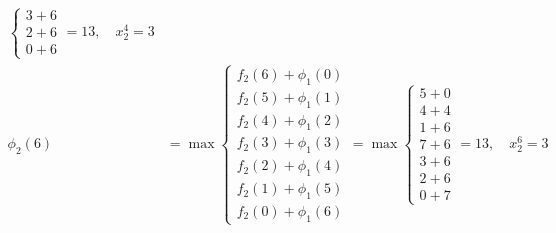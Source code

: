\documentclass{article}
\begin{document}
\[\begin{aligned}
\begin{cases}
                                                  3 + 6 \\
                                                  2 + 6 \\
                                                  0 + 6
                                              \end{cases} = 13, \quad x_2^4 = 3               \\
        \phi_2(6) & = \max \begin{cases}
                               f_2(6) + \phi_1(0) \\
                               f_2(5) + \phi_1(1) \\
                               f_2(4) + \phi_1(2) \\
                               f_2(3) + \phi_1(3) \\
                               f_2(2) + \phi_1(4) \\
                               f_2(1) + \phi_1(5) \\
                               f_2(0) + \phi_1(6)
                           \end{cases} = \max \begin{cases}
                                                  5 + 0 \\
                                                  4 + 4 \\
                                                  1 + 6 \\
                                                  7 + 6 \\
                                                  3 + 6 \\
                                                  2 + 6 \\
                                                  0 + 7
                                              \end{cases} = 13, \quad x_2^6 = 3               \\
    \end{aligned}
\]
\end{document}
